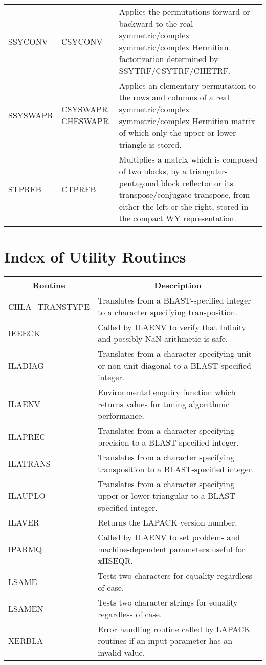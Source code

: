 \begin{center}
\begin{tabular}{| l   p{1.15in} |p{4.1in}    |}
SSYCONV&CSYCONV&
Applies the permutations forward or backward to the 
real symmetric/complex symmetric/complex Hermitian factorization determined by
SSYTRF/CSYTRF/CHETRF.\\
SSYSWAPR&CSYSWAPR CHESWAPR&
Applies an elementary permutation to the rows and columns of 
a real symmetric/complex symmetric/complex Hermitian
matrix of which only the upper or lower triangle is stored. \\
STPRFB&CTPRFB& 
Multiplies a matrix which is composed of two blocks, by a triangular-pentagonal
block reflector or its transpose/conjugate-transpose, from either the left or the right,
stored in the compact WY representation.\\
\hline
\end{tabular}
\end{center}

\newpage

\section{Index of Utility Routines}\label{secindexauxilutility}

\begin{center}
\begin{tabular}{| l | p{5.5in}    |}
\hline \multicolumn{1}{|c|}{Routine}&\multicolumn{1}{c|}{Description} \\ 
\hline \hline
CHLA\_TRANSTYPE&
Translates from a BLAST-specified integer to a character specifying
transposition.\\
IEEECK& 
Called by ILAENV to verify that Infinity and possibly NaN arithmetic is safe.\\
ILADIAG&
Translates from a character specifying unit or non-unit diagonal to a BLAST-specified integer.\\
ILAENV &
Environmental enquiry function which returns values for tuning
algorithmic performance.\\
ILAPREC& 
Translates from a character specifying precision to a BLAST-specified integer.\\
ILATRANS&
Translates from a character specifying transposition to a BLAST-specified integer.\\
ILAUPLO&
Translates from a character specifying upper or lower triangular to a BLAST-specified integer.\\
ILAVER&
Returns the LAPACK version number.\\
IPARMQ&
Called by ILAENV to set problem- and machine-dependent parameters useful for xHSEQR.\\
LSAME&
Tests two characters for equality regardless of case.\\
LSAMEN&
Tests two character strings for equality regardless of case.\\
XERBLA&
Error handling routine called by LAPACK routines 
if an input parameter has an invalid value.\\
\hline
\end{tabular}
\end{center}


